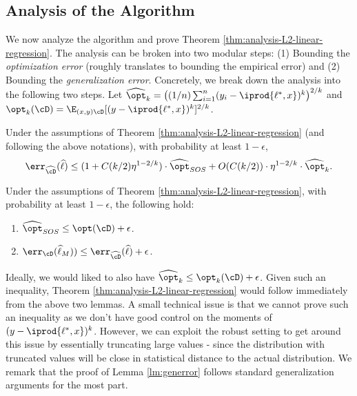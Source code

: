 \subsection{Analysis of the Algorithm}
We now analyze the algorithm and prove Theorem \ref{thm:analysis-L2-linear-regression}. The analysis can be broken into two modular steps: (1) Bounding the \emph{optimization error} (roughly translates to bounding the empirical error) and (2) Bounding the \emph{generalization error}. Concretely, we break down the analysis into the following two steps. Let $\widehat{\opt}_k = \left((1/n) \sum_{i=1}^n (y_i - \iprod{\ell^*,x})^k\right)^{2/k}$ and $\opt_k(\cD) = \E_{(x,y) \cD}[ (y - \iprod{\ell^*,x})^k]^{2/k}$. 

\begin{lemma}\label{lm:opterror}
Under the assumptions of Theorem \ref{thm:analysis-L2-linear-regression} (and following the above notations), with probability at least $1-\epsilon$, 
$$\err_{\widehat{\cD}}(\widehat{\ell}) \leq (1 + C(k/2) \eta^{1-2/k} ) \cdot \widehat{\opt}_{SOS} + O(C(k/2)) \cdot \eta^{1-2/k} \cdot \widehat{\opt}_k.$$
\end{lemma}

\begin{lemma}\label{lm:generror}
Under the assumptions of Theorem \ref{thm:analysis-L2-linear-regression}, with probability at least $1-\epsilon$, the following hold:
\begin{enumerate}
\item $\widehat{\opt}_{SOS}  \leq \opt(\cD) + \epsilon$.

\item $\err_{\cD}(\widehat{\ell}_M)) \leq \err_{\widehat{\cD}}(\widehat{\ell}) + \epsilon$.
\end{enumerate}
\end{lemma}

Ideally, we would liked to also have $\widehat{\opt}_k \leq  \opt_k(\cD) + \epsilon$. Given such an inequality, Theorem \ref{thm:analysis-L2-linear-regression} would follow immediately from the above two lemmas. A small technical issue is that we cannot prove such an inequality as we don't have good control on the moments of $(y - \iprod{\ell^*,x})^k$. However, we can exploit the robust setting to get around this issue by essentially truncating large values - since the distribution with truncated values will be close in statistical distance to the actual distribution. We remark that the proof of Lemma \ref{lm:generror} follows standard generalization arguments for the most part. 

